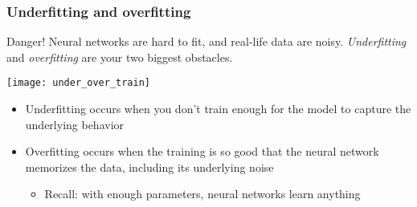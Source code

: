 \begin{frame}
    \frametitle{Underfitting and overfitting}

    \begin{alertblock}{Danger!}
        Neural networks are hard to fit, and real-life data are noisy.
        \emph{Underfitting} and \emph{overfitting} are your two biggest obstacles.
    \end{alertblock}
    \vspace{1ex}

    \texttt{[image: under\_over\_train]}
    \pause

    \begin{itemize}
        \item Underfitting occurs when you don't train enough for the model to capture the underlying behavior
        \item Overfitting occurs when the training is so good that the neural network memorizes the data, including its underlying noise
        \begin{itemize}
            \item Recall: with enough parameters, neural networks learn anything
        \end{itemize}
    \end{itemize}
\end{frame}


